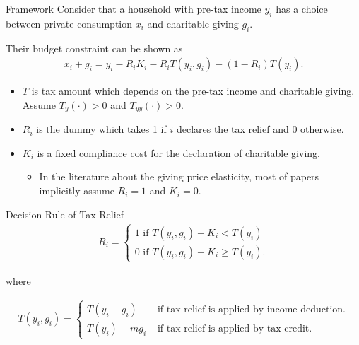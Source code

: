 \documentclass[
  ignorenonframetext,
  aspectratio=169,
]{beamer}
\providecommand{\tightlist}{%
  \setlength{\itemsep}{0pt}\setlength{\parskip}{0pt}}
\begin{document}
\begin{frame}{Framework}
\protect\hypertarget{framework}{}
Consider that a household with pre-tax income \(y_i\) has a choice between private consumption \(x_i\) and charitable giving \(g_i\).

Their budget constraint can be shown as
\begin{align}
x_i + g_i = y_i - R_iK_i - R_iT(y_i, g_i) - (1-R_i)T(y_i). \label{eq:budget}
\end{align}

\begin{itemize}
\tightlist
\item
  \(T\) is tax amount which depends on the pre-tax income and charitable giving. Assume \(T_y(\cdot)>0\) and \(T_{yy}(\cdot)>0\).
\item
  \(R_i\) is the dummy which takes 1 if \(i\) declares the tax relief and 0 otherwise.
\item
  \(K_i\) is a fixed compliance cost for the declaration of charitable giving.

  \begin{itemize}
  \tightlist
  \item
    In the literature about the giving price elasticity, most of papers implicitly assume \(R_i=1\) and \(K_i=0\).
  \end{itemize}
\end{itemize}
\end{frame}

\begin{frame}{Decision Rule of Tax Relief}
\protect\hypertarget{decision-rule-of-tax-relief}{}
\begin{align}
  R_i = \begin{cases}
      1 \text{ if }T(y_i, g_i) + K_i<T(y_i)\\
      0 \text{ if }T(y_i, g_i) + K_i\ge T(y_i). \label{eq:R}
  \end{cases}
\end{align}

where

\begin{align}
  T(y_i, g_i) =
  \begin{cases} 
      T(y_i-g_i)&\text{ if tax relief is applied by income deduction.}\\
      T(y_i)-mg_i &\text{ if tax relief is applied by tax credit.} \label{eq:relief}
  \end{cases}
\end{align}
\end{frame}
\end{document}
